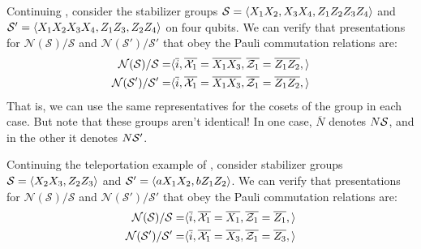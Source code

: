 \begin{example}
    Continuing , consider the stabilizer groups $\mathcal{S} = \langle X_1 X_2, X_3 X_4, Z_1 Z_2 Z_3 Z_4 \rangle$ and $\mathcal{S}' = \langle X_1 X_2 X_3 X_4, Z_1 Z_3, Z_2 Z_4 \rangle$ on four qubits.
    We can verify that presentations for $\mathcal{N(S)/S}$ and $\mathcal{N(S')/S'}$ that obey the Pauli commutation relations are:
    \begin{equation}
        \begin{aligned}
            \mathcal{N(S)/S} = &\langle
                \overline{i},
                \overline{\mathcal{X}_1} = \overline{X_1 X_3}, \overline{\mathcal{Z}_1} = \overline{Z_1 Z_2},
            \rangle \\
            \mathcal{N(S')/S'} = &\langle
                \overline{i},
                \overline{\mathcal{X}_1} = \overline{X_1 X_3}, \overline{\mathcal{Z}_1} = \overline{Z_1 Z_2},
            \rangle
        \end{aligned}
    \end{equation}
    That is, we can use the same representatives for the cosets of the group in each case.
    But note that these groups aren't identical!
    In one case, $\overline{N}$ denotes $N\mathcal{S}$, and in the other it denotes $N\mathcal{S}'$.
\end{example}

\begin{example}
    Continuing the teleportation example of , consider stabilizer groups $\mathcal{S} = \langle X_2 X_3, Z_2 Z_3 \rangle$ and $\mathcal{S}' = \langle a X_1 X_2, b Z_1 Z_2 \rangle$.
    We can verify that presentations for $\mathcal{N(S)/S}$ and $\mathcal{N(S')/S'}$ that obey the Pauli commutation relations are:
    \begin{equation}
        \begin{aligned}
            \mathcal{N(S)/S} = &\langle
            \overline{i},
            \overline{\mathcal{X}_1} = \overline{X_1}, \overline{\mathcal{Z}_1} = \overline{Z_1},
            \rangle \\
            \mathcal{N(S')/S'} = &\langle
            \overline{i},
            \overline{\mathcal{X}_1} = \overline{X_3}, \overline{\mathcal{Z}_1} = \overline{Z_3},
            \rangle
        \end{aligned}
    \end{equation}
\end{example}